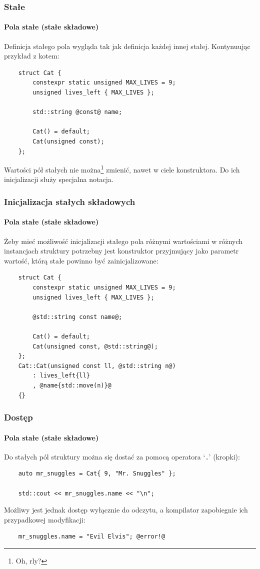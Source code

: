 \documentclass[aspectratio=169,10pt]{beamer}
\begin{document}
\begin{frame}[fragile]
    \frametitle{Stałe}
    \framesubtitle{Pola stałe (stałe składowe)}

    Definicja stałego pola wygląda tak jak definicja każdej innej stałej.
    Kontynuując przykład z kotem:

    {\scriptsize
    \begin{lstlisting}
    struct Cat {
        constexpr static unsigned MAX_LIVES = 9;
        unsigned lives_left { MAX_LIVES };

        std::string @const@ name;

        Cat() = default;
        Cat(unsigned const);
    };
    \end{lstlisting}}

    Wartości pół stałych nie można\footnote{Oh,
    rly?\label{hackerman_const_field_mutation}} zmienić, nawet w ciele
    konstruktora. Do ich inicjalizacji służy specjalna notacja.
\end{frame}

\begin{frame}[fragile]
    \frametitle{Inicjalizacja stałych składowych}
    \framesubtitle{Pola stałe (stałe składowe)}

    Żeby mieć możliwość inicjalizacji stałego pola różnymi wartościami w różnych
    instancjach struktury potrzebny jest konstruktor przyjmujący jako parametr
    wartość, którą stałe powinno być zainicjalizowane:

    {\scriptsize
    \begin{lstlisting}
    struct Cat {
        constexpr static unsigned MAX_LIVES = 9;
        unsigned lives_left { MAX_LIVES };

        @std::string const name@;

        Cat() = default;
        Cat(unsigned const, @std::string@);
    };
    Cat::Cat(unsigned const ll, @std::string n@)
        : lives_left{ll}
        , @name{std::move(n)}@
    {}
    \end{lstlisting}}
\end{frame}

\begin{frame}[fragile]
    \frametitle{Dostęp}
    \framesubtitle{Pola stałe (stałe składowe)}

    Do stałych pól struktury można się dostać za pomocą operatora `{\tt .}'
    (kropki):

    {\small
    \begin{lstlisting}
    auto mr_snuggles = Cat{ 9, "Mr. Snuggles" };

    std::cout << mr_snuggles.name << "\n";
    \end{lstlisting}}

    Możliwy jest jednak dostęp wyłącznie do odczytu, a kompilator zapobiegnie
    ich przypadkowej modyfikacji:

    {\small
    \begin{lstlisting}
    mr_snuggles.name = "Evil Elvis"; @error!@
    \end{lstlisting}}
\end{frame}
\end{document}
